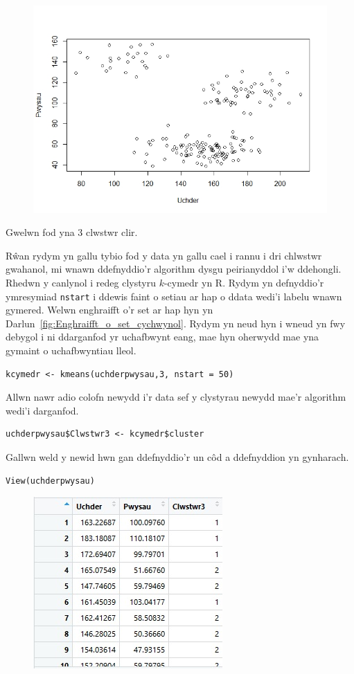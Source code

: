 \begin{figure}[H]
\begin{center}
\includegraphics[width=0.5\linewidth]{../img/ScatterplotR.jpeg}
\end{center}
\label{fig:ScatterplotR}
\end{figure}

Gwelwn fod yna 3 clwstwr clir. 

R\^{w}an rydym yn gallu tybio fod y data yn gallu cael i rannu i dri chlwstwr gwahanol, mi wnawn ddefnyddio'r algorithm dysgu peirianyddol i'w ddehongli. Rhedwn y canlynol i redeg clystyru $k$-cymedr yn R. Rydym yn defnyddio'r ymresymiad \texttt{nstart} i ddewis faint o setiau ar hap o ddata wedi'i labelu wnawn gymered. Welwn enghraifft o'r set ar hap hyn yn Darlun~\ref{fig:Enghraifft_o_set_cychwynol}. Rydym yn neud hyn i wneud yn fwy debygol i ni ddarganfod yr uchafbwynt eang, mae hyn oherwydd mae yna gymaint o uchafbwyntiau lleol.

\begin{verbatim}
kcymedr <- kmeans(uchderpwysau,3, nstart = 50)
\end{verbatim}

Allwn nawr adio colofn newydd i'r data sef y clystyrau newydd mae'r algorithm wedi'i darganfod.

\begin{verbatim}
uchderpwysau$Clwstwr3 <- kcymedr$cluster
\end{verbatim}

Gallwn weld y newid hwn gan ddefnyddio'r un c\^{o}d a ddefnyddion yn gynharach.

\begin{verbatim}
View(uchderpwysau)
\end{verbatim}

\begin{figure}[H]
\begin{center}
\includegraphics[width=0.5\linewidth]{../img/Data3_yn_R.jpg}
\end{center}
\end{figure}

